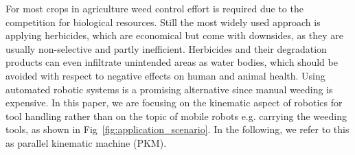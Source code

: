 \documentclass[runningheads]{llncs}
\begin{document}
For most crops in agriculture weed control effort is required due to the competition for biological resources. 
Still the most widely used approach is applying herbicides, which are economical but come with downsides, as they are usually non-selective and partly inefficient. 
Herbicides and their degradation products can even infiltrate unintended areas as water bodies, which should be avoided with respect to negative effects on human and animal health. 
Using automated robotic systems is a promising alternative since manual weeding is expensive. 
In this paper, we are focusing on the kinematic aspect of robotics for tool handling rather than on the topic of mobile robots e.g. carrying the weeding tools, as shown in Fig~\ref{fig:application_scenario}. 
In the following, we refer to this as parallel kinematic machine (PKM).
\end{document}
